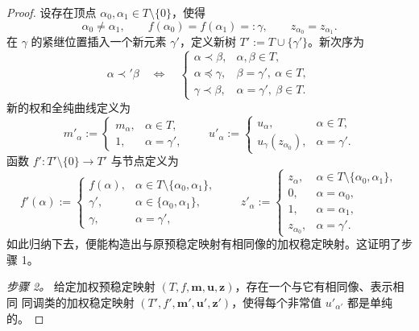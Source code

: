 \begin{proof}
设存在顶点 $\alpha_0,\alpha_1\in T\setminus\{0\}$，使得
\[
  \alpha_0\ne\alpha_1,
  \qquad f(\alpha_0)=f(\alpha_1)=:\gamma,
  \qquad z_{\alpha_0}=z_{\alpha_1}.
\]
在 $\gamma$ 的紧继位置插入一个新元素 $\gamma'$，定义新树
$T':=T\cup\{\gamma'\}$。新次序为
\[
  \alpha\prec'\beta
  \quad\Longleftrightarrow\quad
  \begin{cases}
    \alpha\prec\beta, & \alpha,\beta\in T,\\
    \alpha\preceq\gamma, & \beta=\gamma',\ \alpha\in T,\\
    \gamma\prec\beta, & \alpha=\gamma',\ \beta\in T.
  \end{cases}
\]
新的权和全纯曲线定义为
\[
  m'_\alpha:=
  \begin{cases}
    m_\alpha,&\alpha\in T,\\
    1,&\alpha=\gamma',
  \end{cases}
  \qquad
  u'_\alpha:=
  \begin{cases}
    u_\alpha,&\alpha\in T,\\
    u_\gamma(z_{\alpha_0}),&\alpha=\gamma'.
  \end{cases}
\]
函数 $f':T'\setminus\{0\}\to T'$ 与节点定义为
\[
  f'(\alpha):=
  \begin{cases}
    f(\alpha),&\alpha\in T\setminus\{\alpha_0,\alpha_1\},\\
    \gamma',&\alpha\in\{\alpha_0,\alpha_1\},\\
    \gamma,&\alpha=\gamma',
  \end{cases}
  \qquad
  z'_\alpha:=
  \begin{cases}
    z_\alpha,&\alpha\in T\setminus\{\alpha_0,\alpha_1\},\\
    0,&\alpha=\alpha_0,\\
    1,&\alpha=\alpha_1,\\
    z_{\alpha_0},&\alpha=\gamma'.
  \end{cases}
\]
如此归纳下去，便能构造出与原预稳定映射有相同像的加权稳定映射。这证明了步骤 1。

\emph{步骤 2。}
给定加权预稳定映射 $(T,f,\mathbf m,\mathbf u,\mathbf z)$，存在一个与它有相同像、表示相同
同调类的加权稳定映射 $(T',f',\mathbf m',\mathbf u',\mathbf z')$，使得每个非常值
$u'_{\alpha'}$ 都是单纯的。


\end{proof}
